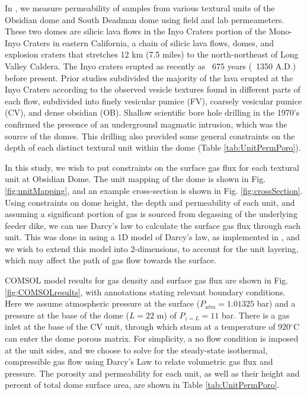 \documentclass[11pt]{amsart}
\begin{document}
In \cite{Graham2023}, we measure permeability of samples from various textural units of the Obsidian dome and South Deadman dome using field and lab permeameters. These two domes are silicic lava flows in the Inyo Craters portion of the Mono-Inyo Craters in eastern California, a chain of silicic lava flows, domes, and explosion craters that stretches 12 km (7.5 miles) to the north-northeast of Long Valley Caldera. The Inyo craters erupted as recently as ~675 years (~1350 A.D.) before present. Prior studies subdivided the majority of the lava erupted at the Inyo Craters according to the observed vesicle textures found in different parts of each flow, subdivided into finely vesicular pumice (FV), coarsely vesicular pumice (CV), and dense obsidian (OB). Shallow scientific bore hole drilling in the 1970's confirmed the presence of an underground magmatic intrusion, which was the source of the domes. This drilling also provided some general constraints on the depth of each distinct textural unit within the dome (Table \ref{tab:UnitPermPoro}).

In this study, we wish to put constraints on the surface gas flux for each textural unit at Obsidian Dome. The unit mapping of the dome is shown in Fig. \ref{fig:unitMapping}, and an example cross-section is shown in Fig. \ref{fig:crossSection}. Using constraints on dome height, the depth and permeability of each unit, and assuming a significant portion of gas is sourced from degassing of the underlying feeder dike, we can use Darcy's law to calculate the surface gas flux through each unit. This was done in \cite{Graham2023} using a 1D model of Darcy's law, as implemented in \cite{Edmonds2003}, and we wish to extend this model into 2-dimensions, to account for the unit layering, which may affect the path of gas flow towards the surface.

COMSOL model results for gas density and surface gas flux are shown in Fig. \ref{fig:COMSOLresults}, with annotations stating relevant boundary conditions. Here we assume atmospheric pressure at the surface ($P_{atm} = 1.01325$ bar) and a pressure at the base of the dome ($L=22$ m) of $P_{z=L} = 11$ bar. There is a gas inlet at the base of the CV unit, through which steam at a temperature of 920$^{\circ}$C can enter the dome porous matrix. For simplicity, a no flow condition is imposed at the unit sides, and we choose to solve for the steady-state isothermal, compressible gas flow using Darcy's Law to relate volumetric gas flux and pressure. The porosity and permeability for each unit, as well as their height and percent of total dome surface area, are shown in Table \ref{tab:UnitPermPoro}.
\end{document}
